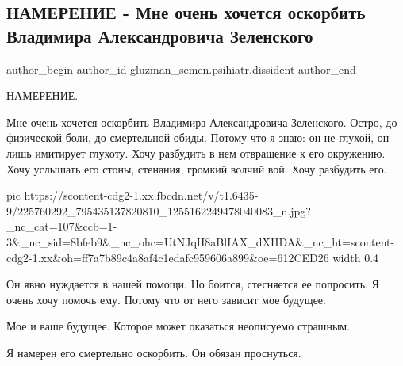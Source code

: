  
 
 
 
 
 
\subsection{НАМЕРЕНИЕ - Мне очень хочется оскорбить Владимира Александровича Зеленского}
\label{sec:29_07_2021.fb.gluzman_semen.psihiatr.dissident.1.namerenie_zelenskii}
 
\ifcmt
 author_begin
   author_id gluzman_semen.psihiatr.dissident
 author_end
\fi

НАМЕРЕНИЕ.

Мне очень хочется оскорбить Владимира Александровича Зеленского. Остро, до
физической боли, до смертельной обиды. Потому что я знаю: он не глухой, он лишь
имитирует глухоту. Хочу разбудить в нем отвращение к его окружению. Хочу
услышать  его стоны, стенания, громкий волчий вой. Хочу разбудить его.

\ifcmt
  pic https://scontent-cdg2-1.xx.fbcdn.net/v/t1.6435-9/225760292_795435137820810_1255162249478040083_n.jpg?_nc_cat=107&ccb=1-3&_nc_sid=8bfeb9&_nc_ohc=UtNJqH8aBlIAX_dXHDA&_nc_ht=scontent-cdg2-1.xx&oh=ff7a7b89c4a8af4c1edafc959606a899&oe=612CED26
  width 0.4
\fi

Он явно нуждается в нашей помощи. Но боится, стесняется ее попросить. Я очень
хочу помочь ему. Потому что от него зависит мое будущее. 

Мое и ваше будущее. Которое может оказаться неописуемо страшным.

Я намерен его смертельно оскорбить. Он обязан проснуться.
